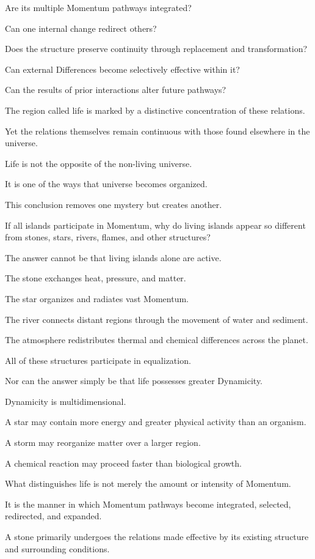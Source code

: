 Are its multiple Momentum pathways integrated?

Can one internal change redirect others?

Does the structure preserve continuity through replacement and transformation?

Can external Differences become selectively effective within it?

Can the results of prior interactions alter future pathways?

The region called life is marked by a distinctive concentration of these relations.

Yet the relations themselves remain continuous with those found elsewhere in the universe.

Life is not the opposite of the non-living universe.

It is one of the ways that universe becomes organized.

This conclusion removes one mystery but creates another.

If all islands participate in Momentum, why do living islands appear so different from stones, stars, rivers, flames, and other structures?

The answer cannot be that living islands alone are active.

The stone exchanges heat, pressure, and matter.

The star organizes and radiates vast Momentum.

The river connects distant regions through the movement of water and sediment.

The atmosphere redistributes thermal and chemical differences across the planet.

All of these structures participate in equalization.

Nor can the answer simply be that life possesses greater Dynamicity.

Dynamicity is multidimensional.

A star may contain more energy and greater physical activity than an organism.

A storm may reorganize matter over a larger region.

A chemical reaction may proceed faster than biological growth.

What distinguishes life is not merely the amount or intensity of Momentum.

It is the manner in which Momentum pathways become integrated, selected, redirected, and expanded.

A stone primarily undergoes the relations made effective by its existing structure and surrounding conditions.

